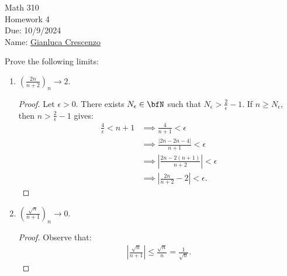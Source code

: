 \documentclass[10pt,twoside,openany]{memoir}
\begin{document}
\begin{center}
    { \Large Math 310 \\[0.1in]Homework 4 \\[0.1in]
    Due: 10/9/2024}\\[.25in]
    { Name:} {\underline{Gianluca Crescenzo\hspace*{2in}}}\\[0.15in]
    \end{center}
    \vspace{4pt}
    \begin{exercise}
        Prove the following limits:
            \begin{enumerate}[label = (\arabic*)]
                \item $\left(\frac{2n}{n+2}\right)_n \rightarrow 2$.
                    \begin{proof}
                        Let $\epsilon > 0$. There exists $N_\epsilon \in \bfN$ such that $N_\epsilon > \frac{2}{\epsilon} - 1$. If $n \geq N_\epsilon$, then $n > \frac{2}{\epsilon} - 1$ gives:
                        \begin{equation*}
                        \begin{split}
                            \frac{4}{\epsilon} < n+ 1 
                            &\implies \frac{4}{n+1} < \epsilon  \\
                            &\implies \frac{|2n -2n - 4|}{n+1} < \epsilon \\
                            &\implies \left|\frac{2n - 2(n+1)}{n+2}\right| < \epsilon\\
                            & \implies \left|\frac{2n}{n+2} - 2\right| < \epsilon.
                        \end{split}
                        \end{equation*}
                    \end{proof}
                \item $\left(\frac{\sqrt{n}}{n+1}\right)_n \rightarrow 0$.
                    \begin{proof}
                        Observe that:
                            \begin{equation*}
                            \begin{split}
                                \left|\frac{\sqrt{n}}{n+1}\right| \leq \frac{\sqrt{n}}{n} = \frac{1}{\sqrt{n}}.
                            \end{split}

\end{equation*}
\end{proof}
\end{enumerate}
\end{exercise}
\end{document}
